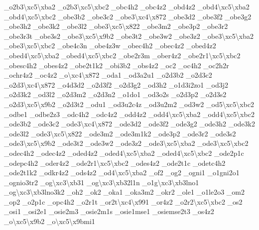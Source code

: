 {\-\_\-o2b3\textbackslash{}xc5\textbackslash{}xba2 \-\_\-o2b3\textbackslash{}xc5\textbackslash{}xbc2 \-\_\-obc4h2 \-\_\-obc4z2 \-\_\-obd4z2 \-\_\-obd4\textbackslash{}xc5\textbackslash{}xba2 \-\_\-obd4\textbackslash{}xc5\textbackslash{}xbc2 \-\_\-obe3b2 \-\_\-obe3c2 \-\_\-obe3\textbackslash{}xc4\textbackslash{}x872 \-\_\-obe3d2 \-\_\-obe3f2 \-\_\-obe3g2 \-\_\-obe3h2 \-\_\-obe3k2 \-\_\-obe3l2 \-\_\-obe3\textbackslash{}xc5\textbackslash{}x822 \-\_\-obe3m2 \-\_\-obe3p2 \-\_\-obe3r2 \-\_\-obe3r3t \-\_\-obe3s2 \-\_\-obe3\textbackslash{}xc5\textbackslash{}x9b2 \-\_\-obe3t2 \-\_\-obe3w2 \-\_\-obe3z2 \-\_\-obe3\textbackslash{}xc5\textbackslash{}xba2 \-\_\-obe3\textbackslash{}xc5\textbackslash{}xbc2 \-\_\-obe4c3n \-\_\-obe4z3w \-\_\-obec4h2 \-\_\-obec4z2 \-\_\-obed4z2 \-\_\-obed4\textbackslash{}xc5\textbackslash{}xba2 \-\_\-obed4\textbackslash{}xc5\textbackslash{}xbc2 \-\_\-obe2r3m \-\_\-ober4z2 \-\_\-obe2r1\textbackslash{}xc5\textbackslash{}xbc2 \-\_\-obesc4h2 \-\_\-obes4z2 \-\_\-obe2t1k2 \-\_\-obi3b2 \-\_\-obs4z2 \-\_\-oc2 \-\_\-oc4h2 \-\_\-oc2h2r \-\_\-ochr4z2 \-\_\-oc4z2 \-\_\-o\textbackslash{}xc4\textbackslash{}x872 \-\_\-oda1 \-\_\-od3a2u1 \-\_\-o2d3b2 \-\_\-o2d3c2 \-\_\-o2d3\textbackslash{}xc4\textbackslash{}x872 \-\_\-o4d3d2 \-\_\-o2d3f2 \-\_\-o2d3g2 \-\_\-od3h2 \-\_\-o1d3i2zo1 \-\_\-od3j2 \-\_\-o2d3k2 \-\_\-od3l2 \-\_\-o2d3m2 \-\_\-o2d3n2 \-\_\-o1do1 \-\_\-od3o2s \-\_\-o2d3p2 \-\_\-o2d3s2 \-\_\-o2d3\textbackslash{}xc5\textbackslash{}x9b2 \-\_\-o2d3t2 \-\_\-odu1 \-\_\-od3u2c4z \-\_\-od3u2m2 \-\_\-od3w2 \-\_\-od5\textbackslash{}xc5\textbackslash{}xbc2 \-\_\-odbe1 \-\_\-odbe2z3 \-\_\-odc4h2 \-\_\-odc4z2 \-\_\-odd4z2 \-\_\-odd4\textbackslash{}xc5\textbackslash{}xba2 \-\_\-odd4\textbackslash{}xc5\textbackslash{}xbc2 \-\_\-ode3b2 \-\_\-ode3c2 \-\_\-ode3\textbackslash{}xc4\textbackslash{}x872 \-\_\-ode3d2 \-\_\-ode3f2 \-\_\-ode3g2 \-\_\-ode3h2 \-\_\-ode3k2 \-\_\-ode3l2 \-\_\-ode3\textbackslash{}xc5\textbackslash{}x822 \-\_\-ode3m2 \-\_\-ode3m1k2 \-\_\-ode3p2 \-\_\-ode3r2 \-\_\-ode3s2 \-\_\-ode3\textbackslash{}xc5\textbackslash{}x9b2 \-\_\-ode3t2 \-\_\-ode3w2 \-\_\-ode3z2 \-\_\-ode3\textbackslash{}xc5\textbackslash{}xba2 \-\_\-ode3\textbackslash{}xc5\textbackslash{}xbc2 \-\_\-odec4h2 \-\_\-odec4z2 \-\_\-oded4z2 \-\_\-oded4\textbackslash{}xc5\textbackslash{}xba2 \-\_\-oded4\textbackslash{}xc5\textbackslash{}xbc2 \-\_\-ode2p1c \-\_\-odepc4h2 \-\_\-oder4z2 \-\_\-ode2r1\textbackslash{}xc5\textbackslash{}xbc2 \-\_\-odes4z2 \-\_\-ode2t1c \-\_\-odetc4h2 \-\_\-ode2t1k2 \-\_\-odkr4z2 \-\_\-ods4z2 \-\_\-od4\textbackslash{}xc5\textbackslash{}xba2 \-\_\-of2 \-\_\-og2 \-\_\-ogni1 \-\_\-o1gni2o1 \-\_\-ognio3tr2 \-\_\-og\textbackslash{}xc3\textbackslash{}xb31 \-\_\-og\textbackslash{}xc3\textbackslash{}xb32l1n \-\_\-o1g\textbackslash{}xc3\textbackslash{}xb3lno1 \-\_\-og\textbackslash{}xc3\textbackslash{}xb3lno3k2 \-\_\-oh2 \-\_\-ok2 \-\_\-oka1 \-\_\-oka3m2 \-\_\-okr2 \-\_\-ole1 \-\_\-o1le2o3 \-\_\-om2 \-\_\-op2 \-\_\-o2p1c \-\_\-opc4h2 \-\_\-o2r1t \-\_\-or2t\textbackslash{}xc4\textbackslash{}x991 \-\_\-or4z2 \-\_\-o2r2\textbackslash{}xc5\textbackslash{}xbc2 \-\_\-os2 \-\_\-osi1 \-\_\-osi2e1 \-\_\-osie2m3 \-\_\-osie2m1s \-\_\-osie1mse1 \-\_\-osiemse2t3 \-\_\-os4z2 \-\_\-o\textbackslash{}xc5\textbackslash{}x9b2 \-\_\-o\textbackslash{}xc5\textbackslash{}x9bmi1 }
